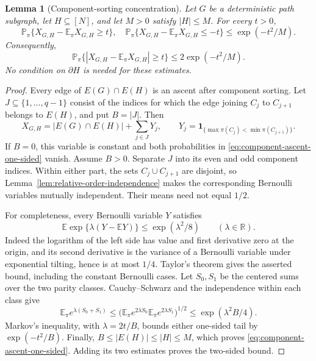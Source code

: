 \documentclass[11pt]{article}
\numberwithin{equation}{section}
\newtheorem{lemma}[theorem]{Lemma}
\theoremstyle{definition}
\theoremstyle{remark}
\newcommand{\E}{\mathbb E}
\newcommand{\Pp}{\mathbb P}
\newcommand{\1}{\mathbf 1}
\begin{document}
\begin{lemma}[Component-sorting concentration]
\label{lem:permutation-bd}
Let \(G\) be a deterministic path subgraph, let \(H\subseteq[N]\),
and let \(M>0\) satisfy \(|H|\le M\).  For every \(t>0\),
\begin{equation}
\label{eq:component-ascent-one-sided}
  \Pp_\pi\{X_{G,H}-\E_\pi X_{G,H}\ge t\},\quad
  \Pp_\pi\{X_{G,H}-\E_\pi X_{G,H}\le-t\}
  \le \exp(-t^2/M).
\end{equation}
Consequently,
\[
  \Pp_\pi\{|X_{G,H}-\E_\pi X_{G,H}|\ge t\}
  \le 2\exp(-t^2/M).
\]
No condition on \(\partial H\) is needed for these estimates.
\end{lemma}

\begin{proof}
Every edge of \(E(G)\cap E(H)\) is an ascent after component
sorting.  Let \(J\subseteq\{1,\ldots,q-1\}\) consist of the
indices for which the edge joining \(C_j\) to \(C_{j+1}\) belongs
to \(E(H)\), and put \(B=|J|\).  Then
\[
  X_{G,H}=|E(G)\cap E(H)|+\sum_{j\in J}Y_j,
  \qquad
  Y_j=\mathbf 1_{\{\max\pi(C_j)<\min\pi(C_{j+1})\}}.
\]
If \(B=0\), this variable is constant and both probabilities in
\eqref{eq:component-ascent-one-sided} vanish.  Assume \(B>0\).
Separate \(J\) into its even and odd component indices.  Within
either part, the sets \(C_j\cup C_{j+1}\) are disjoint, so
Lemma~\ref{lem:relative-order-independence} makes the corresponding
Bernoulli variables mutually independent.  Their means need not equal
\(1/2\).

For completeness, every Bernoulli variable \(Y\) satisfies
\[
  \E\exp\{\lambda(Y-\E Y)\}\le\exp(\lambda^2/8)
  \qquad(\lambda\in\mathbb R).
\]
Indeed the logarithm of the left side has value and first derivative
zero at the origin, and its second derivative is the variance of a
Bernoulli variable under exponential tilting, hence is at most \(1/4\).
Taylor's theorem gives the asserted bound, including the constant
Bernoulli cases.  Let \(S_0,S_1\) be the centered sums over the two
parity classes.  Cauchy--Schwarz and the independence within each class
give
\[
  \E_\pi e^{\lambda(S_0+S_1)}
  \le
  \bigl(\E_\pi e^{2\lambda S_0}
        \E_\pi e^{2\lambda S_1}\bigr)^{1/2}
  \le \exp(\lambda^2B/4).
\]
Markov's inequality, with \(\lambda=2t/B\), bounds either one-sided
tail by \(\exp(-t^2/B)\).  Finally,
\(B\le|E(H)|\le|H|\le M\), which proves
\eqref{eq:component-ascent-one-sided}.  Adding its two estimates proves
the two-sided bound.
\end{proof}
\end{document}
